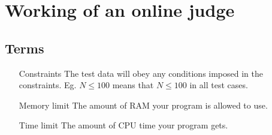 \section{Working of an online judge}
    \subsection{Terms}
        \begin{itemize}
            \item[Constraints]
                The test data will obey any conditions imposed in the constraints. Eg. $N \leq 100$ means that $N \leq 100$ in all test cases.
            \item[Memory limit]
                The amount of RAM your program is allowed to use.
            \item[Time limit]
                The amount of CPU time your program gets.
        \end{itemize}
